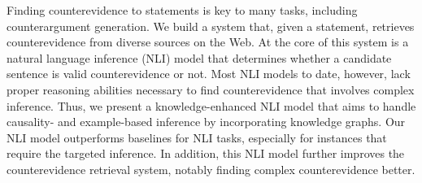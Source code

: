Finding counterevidence to statements is key to many tasks, including counterargument generation. We build a system that, given a statement, retrieves counterevidence from diverse sources on the Web. At the core of this system is a natural language inference (NLI) model that determines whether a candidate sentence is valid counterevidence or not. Most NLI models to date, however, lack proper reasoning abilities necessary to find counterevidence that involves complex inference. Thus, we present a knowledge-enhanced NLI model that aims to handle causality- and example-based inference by incorporating knowledge graphs. Our NLI model outperforms baselines for NLI tasks, especially for instances that require the targeted inference. In addition, this NLI model further improves the counterevidence retrieval system, notably finding complex counterevidence better.
